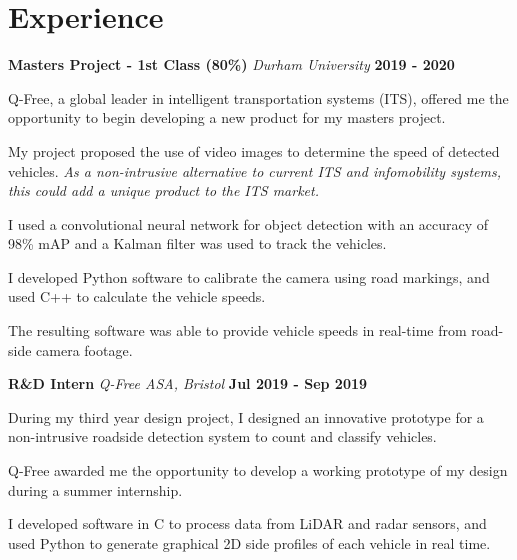 \documentclass[a4paper, 11pt, hidelinks]{article}
\newcommand{\xp}[3]{
	\vspace{0.25em}
	\textbf{\large#1} \quad \emph{\large#2} \hfill \textbf{\large#3}
}
\begin{document}
\begin{minipage}{0.587\textwidth}
	\vspace{-0.25em}

	\section{Experience}
	\xp{Masters Project - 1st Class (80\%)}{Durham University}{2019 - 2020}
	\begin{itemise}

		\item Q-Free, a global leader in intelligent transportation systems (ITS), offered me the opportunity to begin developing a new product for my masters project.
		\item My project proposed the use of video images to determine the speed of detected vehicles. \emph{As a non-intrusive alternative to current ITS and infomobility systems, this could add a unique product to the ITS market.}
		\item I used a convolutional neural network for object detection with an accuracy of 98\% mAP and a Kalman filter was used to track the vehicles.
		\item I developed Python software to calibrate the camera using road markings, and used C++ to calculate the vehicle speeds.
		\item The resulting software was able to provide vehicle speeds in real-time from road-side camera footage.
		\hfill
		\href{https://www.francisgurr.com/pages/masters_project/masters_project.html}{\faLink}
	\end{itemise}
	\xp{R\&D Intern}{Q-Free ASA, Bristol}{Jul 2019 - Sep 2019}
	\begin{itemise}
		\item During my third year design project, I designed an innovative prototype for a non-intrusive roadside detection system to count and classify vehicles.
		\item Q-Free awarded me the opportunity to develop a working prototype of my design during a summer internship.
		\item I developed software in C to process data from LiDAR and radar sensors, and used Python to generate graphical 2D side profiles of each vehicle in real time.

\end{itemise}
\end{minipage}
\end{document}
